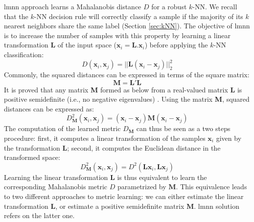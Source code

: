 {\sc lmnn} approach learns a Mahalanobis distance $D$ for a robust $k$-NN. We recall that the $k$-NN decision rule will correctly classify a sample if the majority of its $k$ nearest neighbors share the same label (Section \ref{sec:kNN}). 
The objective of {\sc lmnn} is to increase the number of samples with this property by learning a linear transformation $\textbf{L}$ of the input space ($\textbf{x}_i=\textbf{L}.\textbf{x}_i$) before applying the $k$-NN classification:
\begin{equation}
D(\textbf{x}_i,\textbf{x}_j) = ||\textbf{L}(\textbf{x}_i-\textbf{x}_j)||_2^2
\label{eq:lin}
\end{equation}
Commonly, the squared distances can be expressed in terms of the square matrix:
\begin{equation}
\textbf{M} = \textbf{L}'\textbf{L}
\end{equation}
It is proved that any matrix \textbf{M} formed as below from a real-valued matrix \textbf{L} is positive semidefinite (i.e., no negative eigenvalues) \cite{Weinberger2009}. Using the matrix \textbf{M}, squared distances can be expressed as:
\begin{equation}
D^2_\textbf{M}(\textbf{x}_i,\textbf{x}_j) = (\textbf{x}_i-\textbf{x}_j)\textbf{M}(\textbf{x}_i-\textbf{x}_j)
\end{equation}
\noindent The computation of the learned metric $D_\textbf{M}$ can thus be seen as a two steps procedure: first, it computes a linear transformation of the samples $\textbf{x}_i$ given by the transformation $\textbf{L}$; second, it computes the Euclidean distance in the transformed space:
\begin{equation}
D^2_\textbf{M}(\textbf{x}_i,\textbf{x}_j) = D^2(\textbf{L} \textbf{x}_i,\textbf{L} \textbf{x}_j)
\end{equation}
Learning the linear transformation $\textbf{L}$ is thus equivalent to learn the corresponding Mahalanobis metric $D$ parametrized by $\textbf{M}$. This equivalence leads to two different approaches to metric learning: we can either estimate the linear transformation $\textbf{L}$, or estimate a positive semidefinite matrix $\textbf{M}$. {\sc lmnn} solution refers on the latter one.



